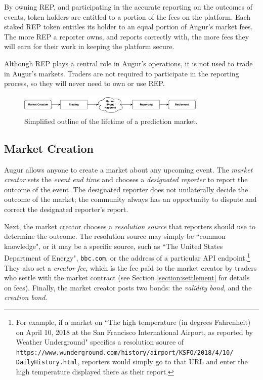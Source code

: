 \documentclass[floatfix,reprint,nofootinbib,amsmath,amssymb,epsfig,pre,floats,letterpaper,groupedaffiliation]{revtex4-1}
\theoremstyle{definition}
\theoremstyle{definition}
\begin{document}
By owning REP, and participating in the accurate reporting on the outcomes of events, token holders are entitled to a portion of the fees on the platform.  Each staked REP token entitles its holder to an equal portion of Augur's market fees.  The more REP a reporter owns, and reports correctly with, the more fees they will earn for their work in keeping the platform secure.

Although REP plays a central role in Augur's operations, it is not used to trade in Augur's markets. Traders are not required to participate in the reporting process, so they will never need to own or use REP.

\begin{figure}
\includegraphics[width=0.8\textwidth]{overview.pdf}
\caption{Simplified outline of the lifetime of a prediction market.}
\label{fig:overview}
\end{figure}

\subsection{Market Creation}

Augur allows anyone to create a market about any upcoming event. The \textit{market creator} sets the \textit{event end time} and chooses a \textit{designated reporter} to report the outcome of the event.  The designated reporter does not unilaterally decide the outcome of the market; the community always has an opportunity to dispute and correct the designated reporter's report.

Next, the market creator chooses a \textit{resolution source} that reporters should use to determine the outcome.  The resolution source may simply be ``common knowledge", or it may be a specific source, such as ``The United States Department of Energy", \texttt{bbc.com}, or the address of a particular API endpoint.\footnote{For example, if a market on ``The high temperature (in degrees Fahrenheit) on April 10, 2018 at the San Francisco International Airport, as reported by Weather Underground" specifies a resolution source of \texttt{https://www.wunderground.com/history/airport/KSFO/2018/4/10/ DailyHistory.html}, reporters would simply go to that URL and enter the high temperature displayed there as their report.}  They also set a \textit{creator fee}, which is the fee paid to the market creator by traders who settle with the market contract (see Section \ref{section:settlement} for details on fees).  Finally, the market creator posts two bonds: the \textit{validity bond}, and the \textit{creation bond}.
\end{document}

